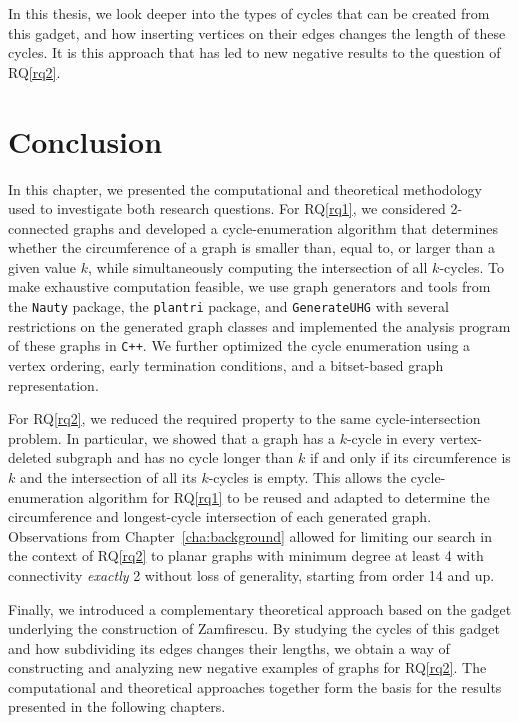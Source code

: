 In this thesis, we look deeper into the types of cycles that can be created from this gadget, and how inserting vertices on their edges changes the length of these cycles. It is this approach that has led to new negative results to the question of RQ\ref{rq2}.

\section{Conclusion}

In this chapter, we presented the computational and theoretical methodology used to investigate both research questions. For RQ\ref{rq1}, we considered 2-connected graphs and developed a cycle-enumeration algorithm that determines whether the circumference of a graph is smaller than, equal to, or larger than a given value $k$, while simultaneously computing the intersection of all $k$-cycles. To make exhaustive computation feasible, we use graph generators and tools from the \texttt{Nauty} package, the \texttt{plantri} package, and \texttt{GenerateUHG} with several restrictions on the generated graph classes and implemented the analysis program of these graphs in \texttt{C++}. We further optimized the cycle enumeration using a vertex ordering, early termination conditions, and a bitset-based graph representation.

For RQ\ref{rq2}, we reduced the required property to the same cycle-intersection problem. In particular, we showed that a graph has a $k$-cycle in every vertex-deleted subgraph and has no cycle longer than $k$ if and only if its circumference is $k$ and the intersection of all its $k$-cycles is empty. This allows the cycle-enumeration algorithm for RQ\ref{rq1} to be reused and adapted to determine the circumference and longest-cycle intersection of each generated graph. Observations from Chapter~\ref{cha:background} allowed for limiting our search in the context of RQ\ref{rq2} to planar graphs with minimum degree at least 4 with connectivity \textit{exactly} 2 without loss of generality, starting from order 14 and up.

Finally, we introduced a complementary theoretical approach based on the gadget underlying the construction of Zamfirescu. By studying the cycles of this gadget and how subdividing its edges changes their lengths, we obtain a way of constructing and analyzing new negative examples of graphs for RQ\ref{rq2}. The computational and theoretical approaches together form the basis for the results presented in the following chapters.
